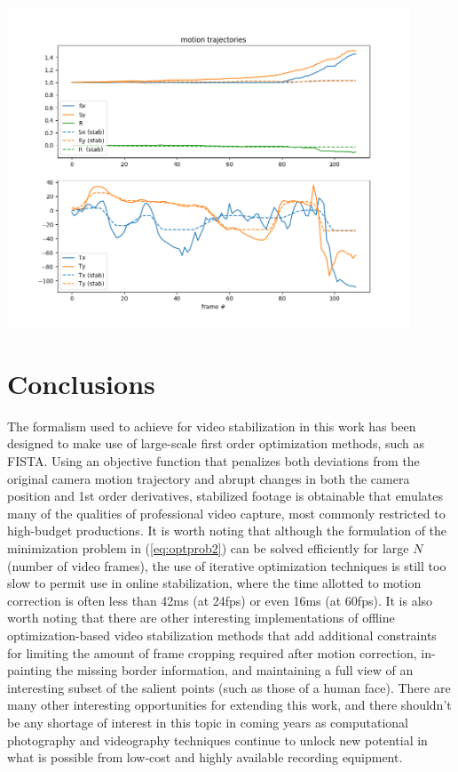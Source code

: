 \documentclass{article} %
\begin{document}
\begin{center}
  \includegraphics[width=0.9\textwidth]{trajetory_FISTA2.png}
  \label{fig:trajFISTA2}
\end{center}

\section{Conclusions}
The formalism used to achieve for video stabilization in this work has been designed to make use of large-scale first order optimization methods, such as FISTA. Using an objective function that penalizes both deviations from the original camera motion trajectory and abrupt changes in both the camera position and 1st order derivatives, stabilized footage is obtainable that emulates many of the qualities of professional video capture, most commonly restricted to high-budget productions. It is worth noting that although the formulation of the minimization problem in (\ref{eq:optprob2}) can be solved efficiently for large $N$ (number of video frames), the use of iterative optimization techniques is still too slow to permit use in online stabilization, where the time allotted to motion correction is often less than 42ms (at 24fps) or even 16ms (at 60fps). It is also worth noting that there are other interesting implementations of offline optimization-based video stabilization methods that add additional constraints for limiting the amount of frame cropping required after motion correction, in-painting the missing border information, and maintaining a full view of an interesting subset of the salient points (such as those of a human face). There are many other interesting opportunities for extending this work, and there shouldn't be any shortage of interest in this topic in coming years as computational photography and videography techniques continue to unlock new potential in what is possible from low-cost and highly available recording equipment.



\end{document}
